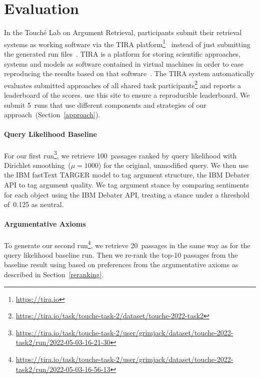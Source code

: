 \section{Evaluation}
\label{evaluation}

In the Touché Lab on Argument Retrieval, participants submit their retrieval systems as working software via the TIRA platform\footnote{\url{https://tira.io}}~\cite{PotthastGWS2019} instead of just submitting the generated run files~\cite{BondarenkoFKSGBPBSWPH2022}.
TIRA is a platform for storing scientific approaches, systems and models as software contained in virtual machines in order to ease reproducing the results based on that software~\cite{PotthastGWS2019}.
The TIRA system automatically evaluates submitted approaches of all shared task participants\footnote{\url{https://tira.io/task/touche-task-2/dataset/touche-2022-task2}} and reports a leaderboard of the  scores.
\citet{BondarenkoFKSGBPBSWPH2022} use this site to ensure a reproducible leaderboard.
We submit 5~runs that use different components and strategies of our approach~(Section~\ref{approach}).

\paragraph{Query Likelihood Baseline}

For our first run\footnote{\url{https://tira.io/task/touche-task-2/user/grimjack/dataset/touche-2022-task2/run/2022-05-03-16-21-30}}, we retrieve 100~passages ranked by query likelihood with Dirichlet smoothing~(\(\mu = 1000\)) for the original, unmodified query. We then use the IBM fastText TARGER model to tag argument structure,
the IBM Debater API to tag argument quality.
We tag argument stance by comparing sentiments for each object using the IBM Debater API, treating a stance under a threshold of~0.125 as neutral.

\paragraph{Argumentative Axioms}

To generate our second run\footnote{\url{https://tira.io/task/touche-task-2/user/grimjack/dataset/touche-2022-task2/run/2022-05-03-16-56-13}}, we retrieve 20~passages in the same way as for the query likelihood baseline run. Then we re-rank the top-10 passages from the baseline result using \KwikSort based on preferences from the argumentative axioms as described in Section~\ref{reranking}.

